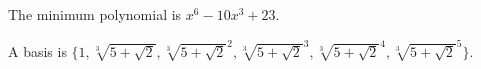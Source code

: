 \documentclass[12pt]{exam}
\begin{document}
\begin{questions}
\begin{parts}
\begin{solution}
The minimum polynomial is $x^6 - 10x^3 + 23$.  

A basis is $\{1, \sqrt[3]{5+\sqrt{2}}, \sqrt[3]{5+\sqrt{2}}^2, \sqrt[3]{5+\sqrt{2}}^3, \sqrt[3]{5+\sqrt{2}}^4, \sqrt[3]{5+\sqrt{2}}^5\}$.
\end{solution}
\vfill
\end{parts} 

\end{questions}
\end{document}
